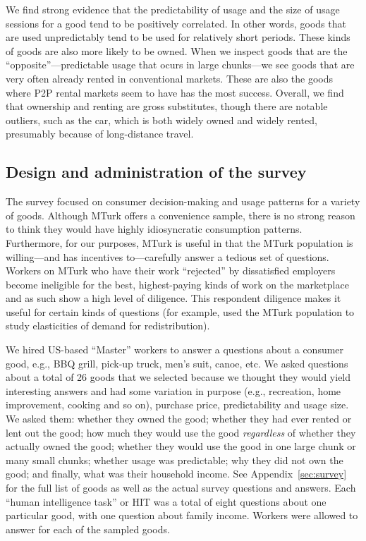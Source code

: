 \documentclass[11pt]{article}
\begin{document}
We find strong evidence that the predictability of usage and the size of usage sessions for a good tend to be positively correlated.
In other words, goods that are used unpredictably tend to be used for relatively short periods.
These kinds of goods are also more likely to be owned. 
When we inspect goods that are the ``opposite''---predictable usage that ocurs in large chunks---we see goods that are very often already rented in conventional markets.
These are also the goods where P2P rental markets seem to have has the most success.
Overall, we find that ownership and renting are gross substitutes, though there are notable outliers, such as the car, which is both widely owned and widely rented, presumably because of long-distance travel. 

\subsection{Design and administration of the survey}
The survey focused on consumer decision-making and usage patterns for a variety of goods. 
Although MTurk offers a convenience sample, there is no strong reason to think they would have highly idiosyncratic consumption patterns. 
Furthermore, for our purposes, MTurk is useful in that the MTurk population is willing---and has incentives to---carefully answer a tedious set of questions.
Workers on MTurk who have their work ``rejected'' by dissatisfied employers become ineligible for the best, highest-paying kinds of work on the marketplace and as such show a high level of diligence.    
This respondent diligence makes it useful for certain kinds of questions (for example, \cite{kuziemko2013elastic} used the MTurk population to study elasticities of demand for redistribution).  

We hired US-based ``Master'' workers to answer a questions about a consumer good, e.g., BBQ grill, pick-up truck, men's suit, canoe, etc.
We asked questions about a total of 26 goods that we selected because we thought they would yield interesting answers and had some variation in purpose (e.g., recreation, home improvement, cooking and so on), purchase price, predictability and usage size. 
We asked them: whether they owned the good; whether they had ever rented or lent out the good; how much they would use the good \emph{regardless} of whether they actually owned the good; whether they would use the good in one large chunk or many small chunks; whether usage was predictable; why they did not own the good; and finally, what was their household income. 
See Appendix~\ref{sec:survey} for the full list of goods as well as the actual survey questions and answers.  
Each ``human intelligence task'' or HIT was a total of eight questions about one particular good, with one question about family income. 
Workers were allowed to answer for each of the sampled goods.  
\end{document}
